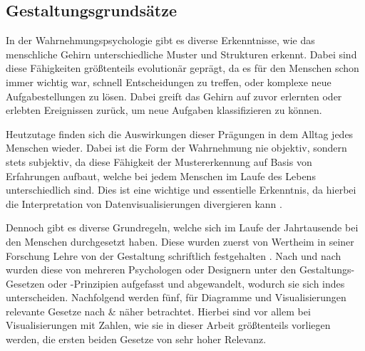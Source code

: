 \subsection{Gestaltungsgrundsätze}
\label{sub:grundsaetze}
In der Wahrnehmungspsychologie gibt es diverse Erkenntnisse, wie das menschliche Gehirn unterschiedliche Muster und Strukturen erkennt.
Dabei sind diese Fähigkeiten größtenteils evolutionär geprägt, da es für den Menschen schon immer wichtig war, schnell Entscheidungen zu treffen, oder komplexe neue Aufgabestellungen zu lösen.
Dabei greift das Gehirn auf zuvor erlernten oder erlebten Ereignissen zurück, um neue Aufgaben klassifizieren zu können.

Heutzutage finden sich die Auswirkungen dieser Prägungen in dem Alltag jedes Menschen wieder.
Dabei ist die Form der Wahrnehmung nie objektiv, sondern stets subjektiv, da diese Fähigkeit der Mustererkennung auf Basis von Erfahrungen aufbaut, welche bei jedem Menschen im Laufe des Lebens unterschiedlich sind.
Dies ist eine wichtige und essentielle Erkenntnis, da hierbei die Interpretation von Datenvisualisierungen divergieren kann \cite[4.3]{Fischer.2014}.

Dennoch gibt es diverse Grundregeln, welche sich im Laufe der Jahrtausende bei den Menschen durchgesetzt haben. Diese wurden zuerst von Wertheim in seiner Forschung \glqq Lehre von der Gestaltung\grqq{} schriftlich festgehalten \cite{Wertheimer.2017}.
Nach und nach wurden diese von mehreren Psychologen oder Designern unter den \glqq Gestaltungs-Gesetzen\grqq{} oder -Prinzipien aufgefasst und abgewandelt, wodurch sie sich indes unterscheiden.
Nachfolgend werden fünf, für Diagramme und Visualisierungen relevante Gesetze nach \cite[5.2]{Heber.2018} \& \cite{Ware.2009} näher betrachtet. 
Hierbei sind vor allem bei Visualisierungen mit Zahlen, wie sie in dieser Arbeit größtenteils vorliegen werden, die ersten beiden Gesetze von sehr hoher Relevanz.

